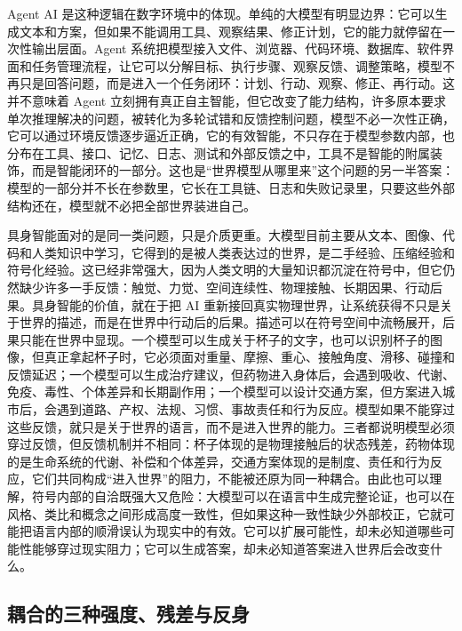 
Agent AI 是这种逻辑在数字环境中的体现。单纯的大模型有明显边界：它可以生成文本和方案，但如果不能调用工具、观察结果、修正计划，它的能力就停留在一次性输出层面。Agent 系统把模型接入文件、浏览器、代码环境、数据库、软件界面和任务管理流程，让它可以分解目标、执行步骤、观察反馈、调整策略，模型不再只是回答问题，而是进入一个任务闭环：计划、行动、观察、修正、再行动。这并不意味着 Agent 立刻拥有真正自主智能，但它改变了能力结构，许多原本要求单次推理解决的问题，被转化为多轮试错和反馈控制问题，模型不必一次性正确，它可以通过环境反馈逐步逼近正确，它的有效智能，不只存在于模型参数内部，也分布在工具、接口、记忆、日志、测试和外部反馈之中，工具不是智能的附属装饰，而是智能闭环的一部分。这也是“世界模型从哪里来”这个问题的另一半答案：模型的一部分并不长在参数里，它长在工具链、日志和失败记录里，只要这些外部结构还在，模型就不必把全部世界装进自己。

具身智能面对的是同一类问题，只是介质更重。大模型目前主要从文本、图像、代码和人类知识中学习，它得到的是被人类表达过的世界，是二手经验、压缩经验和符号化经验。这已经非常强大，因为人类文明的大量知识都沉淀在符号中，但它仍然缺少许多一手反馈：触觉、力觉、空间连续性、物理接触、长期因果、行动后果。具身智能的价值，就在于把 AI 重新接回真实物理世界，让系统获得不只是关于世界的描述，而是在世界中行动后的后果。描述可以在符号空间中流畅展开，后果只能在世界中显现。一个模型可以生成关于杯子的文字，也可以识别杯子的图像，但真正拿起杯子时，它必须面对重量、摩擦、重心、接触角度、滑移、碰撞和反馈延迟；一个模型可以生成治疗建议，但药物进入身体后，会遇到吸收、代谢、免疫、毒性、个体差异和长期副作用；一个模型可以设计交通方案，但方案进入城市后，会遇到道路、产权、法规、习惯、事故责任和行为反应。模型如果不能穿过这些反馈，就只是关于世界的语言，而不是进入世界的能力。三者都说明模型必须穿过反馈，但反馈机制并不相同：杯子体现的是物理接触后的状态残差，药物体现的是生命系统的代谢、补偿和个体差异，交通方案体现的是制度、责任和行为反应，它们共同构成“进入世界”的阻力，不能被还原为同一种耦合。由此也可以理解，符号内部的自洽既强大又危险：大模型可以在语言中生成完整论证，也可以在风格、类比和概念之间形成高度一致性，但如果这种一致性缺少外部校正，它就可能把语言内部的顺滑误认为现实中的有效。它可以扩展可能性，却未必知道哪些可能性能够穿过现实阻力；它可以生成答案，却未必知道答案进入世界后会改变什么。

\subsection{耦合的三种强度、残差与反身}


